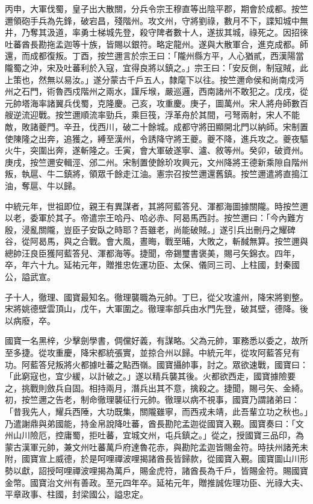 \begin{pinyinscope}
 丙申，大軍伐蜀，皇子出大散關，分兵令宗王穆直等出陰平郡，期會於成都。按竺邇領砲手兵為先鋒，破宕昌，殘階州。攻文州，守將劉祿，數月不下，諜知城中無井，乃奪其汲道，率勇士梯城先登，殺守陴者數十人，遂拔其城，祿死之。因招徠吐蕃酋長勘拖孟迦等十族，皆賜以銀符。略定龍州。遂與大散軍合，進克成都。師還，而成都復叛。丁酉，按竺邇言於宗王曰：「隴州縣方平，人心猶貳，西漢陽當隴蜀之沖，宋及吐蕃利於入寇，宜得良將以鎮之。」宗王曰：「安反側，制寇賊，此上策也，然無以易汝。」遂分蒙古千戶五人，隸麾下以往。按竺邇命侯和尚南戍沔州之石門，術魯西戍階州之兩水，謹斥堠，嚴巡邏，西南諸州不敢犯之。戊戌，從元帥塔海率諸翼兵伐蜀，克隆慶。己亥，攻重慶。庚子，圖萬州。宋人將舟師數百艘逆流迎戰。按竺邇順流率勁兵，乘巨筏，浮革舟於其間，弓弩兩射，宋人不能敵，敗諸夔門。辛丑，伐西川，破二十餘城。成都守將田顯開北門以納師。宋制置使陳隆之出奔，追獲之，縛至漢州，令誘降守將王夔。夔不降，進兵攻之。夔夜驅火牛，突圍出奔，遂斬隆之。壬寅，會大軍破遂寧、瀘、敘等州。癸卯，破資州。庚戌，按竺邇安輯涇、邠二州。宋制置使餘玠攻興元，文州降將王德新乘隙自階州叛，執扈、牛二鎮將，領眾千餘走江油。憲宗召按竺邇還舊鎮。按竺邇遣將直搗江油，奪扈、牛以歸。



 中統元年，世祖即位，親王有異謀者，其將阿藍答兒、渾都海圖據關隴。時按竺邇以老，委軍於其子。帝遣宗王哈丹、哈必赤、阿曷馬西討。按竺邇曰：「今內難方殷，浸亂關隴，豈臣子安臥之時耶？吾雖老，尚能破賊。」遂引兵出刪丹之耀碑谷，從阿曷馬，與之合戰。會大風，晝晦，戰至晡，大敗之，斬馘無算。按竺邇與總帥汪良臣獲阿藍答兒、渾都海等。捷聞，帝錫璽書褒美，賜弓矢錦衣。四年，卒，年六十九。延祐元年，贈推忠佐運功臣、太保、儀同三司、上柱國，封秦國公，謚武宣。



 子十人，徹理、國寶最知名。徹理襲職為元帥。丁巳，從父攻瀘州，降宋將劉整。宋將姚德壁雲頂山，戊午，大軍圍之。徹理率部兵由水門先登，破其壁，德降。後以病廢，卒。



 國寶一名黑梓，少擊劍學書，倜儻好義，有謀略。父為元帥，軍務悉以委之，故所至多捷。從攻重慶，降宋都統張實，並掠合州以歸。中統元年，從攻阿藍答兒有功。阿藍答兒叛將火都據吐蕃之點西嶺。國寶攝帥事，討之。眾欲速戰，國寶曰：「此窮寇也，宜少緩，以計破之。」遂以精兵襲其後。火都欲西走，國寶據險要之，挑戰則斂兵自固。相持兩月，潛兵出其不意，擒殺之。捷聞，賜弓矢、金綺。初，按竺邇之告老，制命徹理襲征行元帥。徹理以病不視事，國寶乃謂諸弟曰：「昔我先人，耀兵西陲，大功既集，關隴雖寧，而西戎未靖，此吾輩立功之秋也。」乃遣謝鼎與弟國能，持金帛說降吐蕃，酋長勘陀孟迦從國寶入覲。國寶奏曰：「文州山川險厄，控庸蜀，拒吐蕃，宜城文州，屯兵鎮之。」從之，授國寶三品印，為蒙古漢軍元帥，兼文州吐蕃萬戶府達魯花赤，與勘陀孟迦皆賜金符。時扶州諸羌未附，國寶宣上威德，於是呵哩禪波哩揭諸酋長皆歸款，從國寶入覲。國寶圖山川形勢以獻，詔授呵哩禪波哩揭為萬戶，賜金虎符，諸酋長為千戶，皆賜金符。賜國寶金幣。國寶治文州有善政。至元四年卒。延祐元年，贈推誠佐理功臣、光祿大夫、平章政事、柱國，封梁國公，謚忠定。




\end{pinyinscope}
